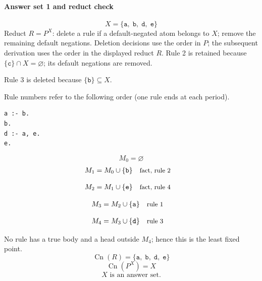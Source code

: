 \documentclass[a4paper,11pt]{article}
\newif\ifexplain
\newcommand{\explain}[1]{\ifexplain\begin{erklbox}#1\end{erklbox}\fi}
\newcommand{\why}[1]{\text{\small #1}}
\newcommand{\at}[1]{\texttt{#1}}
\begin{document}
\paragraph{Answer set 1 and reduct check}
\[
X=\{\at{a},\;\at{b},\;\at{d},\;\at{e}\}
\]
Reduct $R=P^X$: delete a rule if a default-negated atom belongs to $X$; remove the remaining default negations. Deletion decisions use the order in $P$; the subsequent derivation uses the order in the displayed reduct $R$.
Rule 2 is retained because $\{\at{c}\}\cap X=\varnothing$; its default negations are removed.

Rule 3 is deleted because $\{\at{b}\}\subseteq X$.

Rule numbers refer to the following order (one rule ends at each period).
\begin{small}
\begin{verbatim}
a :- b.
b.
d :- a, e.
e.
\end{verbatim}
\end{small}
\explain{Beim Redukt bleibt die Kandidatenmenge fest. Wir entscheiden zuerst, welche Regeln wegfallen. Erst danach berechnen wir aus den verbleibenden positiven Regeln die kleinste abgeschlossene Menge. Ein Modell allein reicht nicht: Diese Menge muss genau der Kandidat sein.}
\[
M_0=\varnothing
\]
\begin{align*}
M_{1} &= M_{0}\cup \{\at{b}\} && \why{fact, rule 2}
\end{align*}
\explain{Diese Regel hat keinen Körper. Ihr Kopf $\at{b}$ ist damit ein Fakt und muss in die Menge.}
\begin{align*}
M_{2} &= M_{1}\cup \{\at{e}\} && \why{fact, rule 4}
\end{align*}
\explain{Diese Regel hat keinen Körper. Ihr Kopf $\at{e}$ ist damit ein Fakt und muss in die Menge.}
\begin{align*}
M_{3} &= M_{2}\cup \{\at{a}\} && \why{rule 1}
\end{align*}
\explain{Für $\at{a}$ brauchen wir $\at{b}$. Weil diese Voraussetzungen bereits hergeleitet sind, dürfen wir den Regelkopf jetzt aufnehmen und alle bisherigen Atome behalten; bei einer fehlenden Voraussetzung würde diese Regel dagegen noch nichts beitragen.}
\begin{align*}
M_{4} &= M_{3}\cup \{\at{d}\} && \why{rule 3}
\end{align*}
\explain{Für $\at{d}$ brauchen wir $\at{a}$ und $\at{e}$. Weil diese Voraussetzungen bereits hergeleitet sind, dürfen wir den Regelkopf jetzt aufnehmen und alle bisherigen Atome behalten; bei einer fehlenden Voraussetzung würde diese Regel dagegen noch nichts beitragen.}
No rule has a true body and a head outside $M_{4}$; hence this is the least fixed point.
\[
\operatorname{Cn}(R)=\{\at{a},\;\at{b},\;\at{d},\;\at{e}\}
\]
\[
\operatorname{Cn}(P^X)=X
\]
\[
\boxed{X\text{ is an answer set.}}
\]
\end{document}

